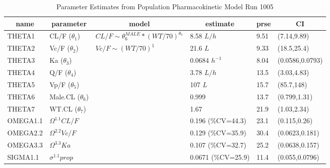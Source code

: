 %
\begin{table}[ht]
 \caption[Model 10o5 Parameters]{Parameter Estimates from Population Pharmacokinetic Model Run 1005\label{p1005}} 
 \begin{center}
 \begin{tabular}{llllll}\hline\hline
\multicolumn{1}{c}{name}&\multicolumn{1}{c}{parameter}&\multicolumn{1}{c}{model}&\multicolumn{1}{c}{estimate}&\multicolumn{1}{c}{prse}&\multicolumn{1}{c}{CI}\tabularnewline
\hline
THETA1&CL/F ($\theta_1$)&$CL/F \sim \theta_6^{MALE} * (WT/70)^{\theta_7}$&8.58 $L/h$&9.51&(7.14,9.89)\tabularnewline
THETA2&Vc/F ($\theta_2$)&$Vc/F \sim (WT/70)^{1}$&21.6 $L$&9.33&(18.5,25.4)\tabularnewline
THETA3&Ka ($\theta_3$)&&0.0684 $h^{-1}$&8.04&(0.0586,0.0793)\tabularnewline
THETA4&Q/F ($\theta_4$)&&3.78 $L/h$&13.5&(3.03,4.83)\tabularnewline
THETA5&Vp/F ($\theta_5$)&&107 $L$&15.7&(85.7,148)\tabularnewline
THETA6&Male.CL ($\theta_6$)&&0.999&13.7&(0.799,1.31)\tabularnewline
THETA7&WT.CL ($\theta_7$)&&1.67&21.9&(1.03,2.34)\tabularnewline
OMEGA1.1&$\Omega^{1.1}CL/F$&&0.196 (\%CV=44.3)&23.1&(0.115,0.26)\tabularnewline
OMEGA2.2&$\Omega^{2.2}Vc/F$&&0.129 (\%CV=35.9)&30.4&(0.0623,0.181)\tabularnewline
OMEGA3.3&$\Omega^{3.3}Ka$&&0.107 (\%CV=32.7)&25.2&(0.0638,0.157)\tabularnewline
SIGMA1.1&$\sigma^{1.1}prop$&&0.0671 (\%CV=25.9)&11.4&(0.055,0.0796)\tabularnewline
\hline
\end{tabular}

\end{center}

\end{table}

